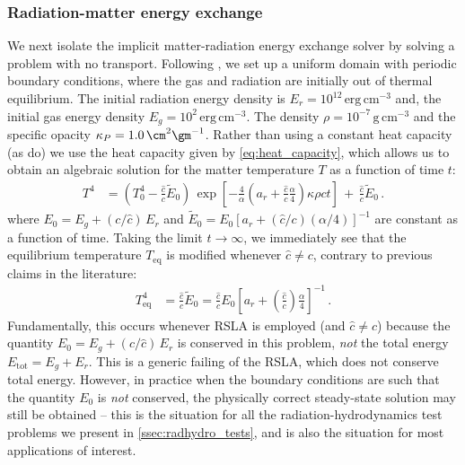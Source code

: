 \documentclass[fleqn,usenatbib]{mnras}
\begin{document}
\subsubsection{Radiation-matter energy exchange}
\label{section:equilibrium}
We next isolate the implicit matter-radiation energy exchange solver by solving a problem with no transport. Following \citet{Turner_2001}, we set up a uniform domain with periodic boundary conditions, where the gas and radiation are initially out of thermal equilibrium. The initial radiation energy density is $E_r = 10^{12} \, \text{erg} \, \text{cm}^{-3}$ and, the initial gas energy density $E_g = 10^2 \, \text{erg} \, \text{cm}^{-3}$. The density $\rho = 10^{-7} \, \text{g} \, \text{cm}^{-3}$ and the specific opacity $\kappa_P = 1.0 \, \cm^{2} \gm^{-1}$. Rather than using a constant heat capacity (as \citealt{Turner_2001} do) we use the heat capacity given by \autoref{eq:heat_capacity}, which allows us to obtain an algebraic solution for the matter temperature $T$ as a function of time $t$:
\begin{align}
T^4 &= \left( T_{0}^4 - \frac{\hat c}{c} \tilde E_0 \right) \, \exp \left[ -\frac{4}{\alpha} \left( a_r + \frac{\hat c}{c} \frac{\alpha}{4} \right) \kappa \rho c t \right] \, + \, \frac{\hat c}{c} \tilde E_0 \, .
\label{eq:rsla_temperature}
\end{align}
where $E_0 = E_{g} + (c/\hat c) \, E_{r}$ and $\tilde E_0 = E_0 \left[ a_r + (\hat c / c) (\alpha / 4) \right]^{-1}$ are constant as a function of time. Taking the limit $t \rightarrow \infty$, we immediately see that the equilibrium temperature $T_{\text{eq}}$ is modified whenever $\hat c \neq c$, contrary to previous claims in the literature:
\begin{align}
T_{\text{eq}}^4 &= \frac{\hat c}{c} \tilde E_0 = \frac{\hat c}{c} E_0 \left[ a_r + \left(\frac{\hat c}{c} \right) \frac{\alpha}{4} \right]^{-1} \, .
\end{align}
Fundamentally, this occurs whenever RSLA is employed (and $\hat c \neq c$) because the quantity $E_0 = E_g + (c / \hat c) \, E_r$ is conserved in this problem, \emph{not} the total energy $E_{\text{tot}} = E_g + E_r$. This is a generic failing of the RSLA, which does not conserve total energy. However, in practice when the boundary conditions are such that the quantity $E_0$ is \emph{not} conserved, the physically correct steady-state solution may still be obtained -- this is the situation for all the radiation-hydrodynamics test problems we present in \autoref{ssec:radhydro_tests}, and is also the situation for most applications of interest.
\end{document}
